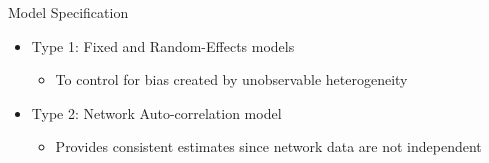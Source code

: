 \begin{frame}{{\color{violet}Model Specification}}

  \begin{itemize}
    \item Type 1: Fixed and Random-Effects models
    \begin{itemize}
    	\item To control for bias created by unobservable heterogeneity
    \end{itemize}
    \item Type 2: Network Auto-correlation model
    \begin{itemize}
    	\item Provides consistent estimates since network data are not independent
    \end{itemize}
  \end{itemize}

\end{frame}
